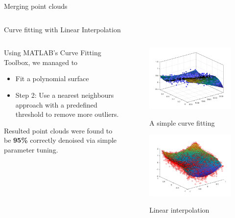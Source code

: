 \documentclass{beamer}
\begin{document}
\begin{frame}{Merging point clouds}
\begin{columns}
\begin{column}{0.6\textwidth}
\begin{center}
		\end{center}
	\end{column}
\end{columns}


\end{frame}


\begin{frame}{Curve fitting with Linear Interpolation}

\begin{columns}
	\begin{column}{0.49\textwidth}
Using MATLAB's Curve Fitting Toolbox, we managed to 
\begin{itemize}
	\item Fit a polynomial surface
	\item Step 2: Use a nearest neighbours approach with a predefined threshold to remove more outliers. 
\end{itemize}

Resulted point clouds were found to be \textbf{95\%} correctly denoised via simple parameter tuning.
	\end{column}
	\begin{column}{0.6\textwidth}  %
		\begin{center}
			\begin{figure}
				\includegraphics[width=0.6\linewidth]{Figures/FitA}
				\label{fitA}
				\caption{A simple curve fitting}
			\end{figure}
			\begin{figure}
				\includegraphics[width=0.5\linewidth]{Figures/interp}
				\label{interp}
				\caption{Linear interpolation}
			\end{figure}
			

\end{center}
\end{column}
\end{columns}
\end{frame}
\end{document}
